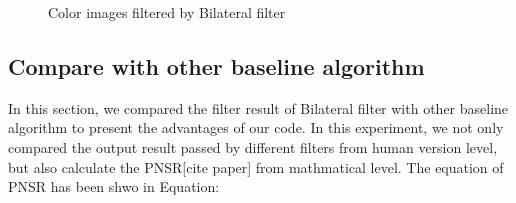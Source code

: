 \documentclass[12pt]{article}
\begin{document}
\begin{figure}[H]
{  }
  \quad
  \quad
  \quad
  \quad
  \caption{Color images filtered by Bilateral filter}
\end{figure}


\subsection{Compare with other baseline algorithm}
In this section, we compared the filter result of Bilateral filter with other baseline algorithm to present the advantages of our code.
In this experiment, we not only compared the output result passed by different filters from human version level, but also calculate the PNSR[cite paper] from mathmatical level. 
The equation of PNSR has been shwo in Equation:
\end{document}
